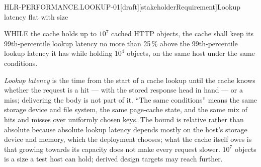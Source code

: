 \begin{requirement}{HLR-PERFORMANCE.LOOKUP-01}[draft][stakeholderRequirement]{Lookup latency flat with size}


  WHILE the cache holds up to $10^7$ cached HTTP objects, the cache shall
  keep its 99th-percentile lookup latency no more than 25\,\% above the
  99th-percentile lookup latency it has while holding $10^4$ objects, on the
  same host under the same conditions.

  \emph{Lookup latency} is the time from the start of a cache lookup until
  the cache knows whether the request is a hit --- with the stored response
  head in hand --- or a miss; delivering the body is not part of it. ``The
  same conditions'' means the same storage device and file system, the same
  page-cache state, and the same mix of hits and misses over uniformly chosen
  keys. The bound is relative rather than absolute because absolute lookup
  latency depends mostly on the host's storage device and memory, which the
  deployment chooses; what the cache itself owes is that growing towards its
  capacity does not make every request slower. $10^7$ objects is a size a
  test host can hold; derived design targets may reach further.


\end{requirement}

